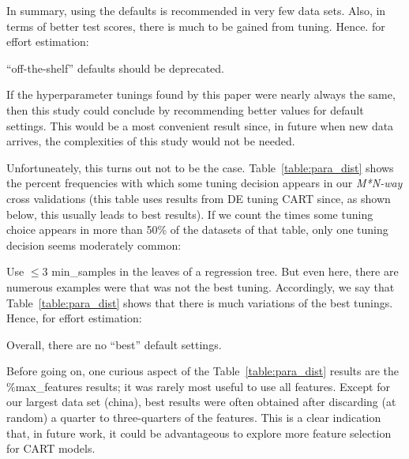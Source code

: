  In summary,  using the defaults is recommended in very few
 data sets. Also, in terms of better test scores,
 there is much to be gained   from tuning. Hence. for effort estimation:
 
 \begin{result}{1}
``off-the-shelf'' defaults
 should be deprecated.
 \end{result}
 


 

 
 If the hyperparameter tunings found by this paper
 were nearly always the same, then this study
 could conclude by recommending better values
 for default settings. This would
 be a most convenient result since, 
 in future when new data arrives, the complexities of this study 
 would not be needed.
 
Unfortuneately, this turns out not to be the case.
Table~\ref{table:para_dist} shows the percent frequencies with which
some tuning decision appears in our {\em M*N-way} cross validations
(this table uses results from DE tuning CART since, as shown below,
this usually leads to best results).
If we count the times some tuning choice appears in more than 50\% of the datasets of that table, only one tuning decision seems moderately common:
\bi
\item
Use $\le 3$ min\_samples
in the leaves of a regression tree.
\ei
But even here, there are numerous examples
were that was not the best tuning.
Accordingly, we  say that Table~\ref{table:para_dist} shows that there is
much variations of the best tunings. 
Hence, for effort estimation:

 \begin{result}{2}
 Overall, there are no ``best'' default settings.
 \end{result}

Before going on, one curious aspect of the Table~\ref{table:para_dist} results are the 
\%max\_features results; it was rarely most useful to use all features. Except for our largest data set (china), best results were often obtained after discarding (at random) a quarter to three-quarters of the features. This is a clear indication that, in future work, it could be advantageous to explore more feature selection for CART models.

 
 


